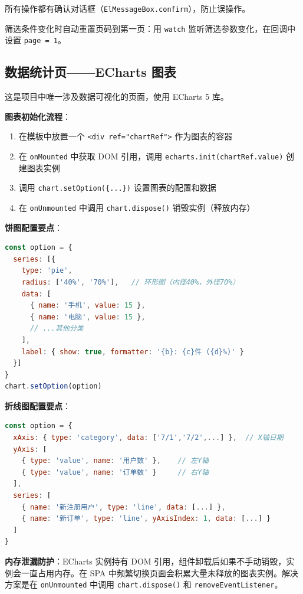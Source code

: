 \documentclass[12pt,a4paper]{ctexart}
\begin{document}
所有操作都有确认对话框（\texttt{ElMessageBox.confirm}），防止误操作。

筛选条件变化时自动重置页码到第一页：用 \texttt{watch} 监听筛选参数变化，在回调中设置 \texttt{page = 1}。

\subsection{数据统计页——ECharts 图表}

这是项目中唯一涉及数据可视化的页面，使用 ECharts 5 库。

\textbf{图表初始化流程}：
\begin{enumerate}
  \item 在模板中放置一个 \texttt{<div ref="chartRef">} 作为图表的容器
  \item 在 \texttt{onMounted} 中获取 DOM 引用，调用 \texttt{echarts.init(chartRef.value)} 创建图表实例
  \item 调用 \texttt{chart.setOption(\{...\})} 设置图表的配置和数据
  \item 在 \texttt{onUnmounted} 中调用 \texttt{chart.dispose()} 销毁实例（释放内存）
\end{enumerate}

\textbf{饼图配置要点}：
\begin{lstlisting}[language=JavaScript]
const option = {
  series: [{
    type: 'pie',
    radius: ['40%', '70%'],   // 环形图（内径40%，外径70%）
    data: [
      { name: '手机', value: 15 },
      { name: '电脑', value: 15 },
      // ...其他分类
    ],
    label: { show: true, formatter: '{b}: {c}件 ({d}%)' }
  }]
}
chart.setOption(option)
\end{lstlisting}

\textbf{折线图配置要点}：
\begin{lstlisting}[language=JavaScript]
const option = {
  xAxis: { type: 'category', data: ['7/1','7/2',...] },  // X轴日期
  yAxis: [
    { type: 'value', name: '用户数' },    // 左Y轴
    { type: 'value', name: '订单数' }     // 右Y轴
  ],
  series: [
    { name: '新注册用户', type: 'line', data: [...] },
    { name: '新订单', type: 'line', yAxisIndex: 1, data: [...] }
  ]
}
\end{lstlisting}

\textbf{内存泄漏防护}：ECharts 实例持有 DOM 引用，组件卸载后如果不手动销毁，实例会一直占用内存。在 SPA 中频繁切换页面会积累大量未释放的图表实例。解决方案是在 \texttt{onUnmounted} 中调用 \texttt{chart.dispose()} 和 \texttt{removeEventListener}。

\end{document}
